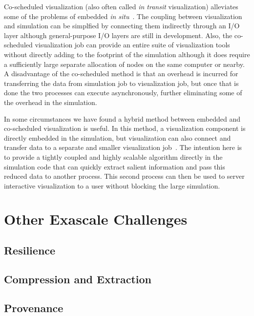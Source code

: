 \documentclass[conference]{IEEEtran}
\newcommand*{\lcite}[1]{~\cite{#1}}
\newcommand{\insitu}{{\it in situ}\xspace}
\newcommand{\intransit}{{\it in transit}\xspace}
\begin{document}
Co-scheduled visualization (also often called \intransit visualization)
alleviates some of the problems of embedded
\insitu\lcite{Moreland2011:PDAC,Biddiscombe2012,Klasky2011}.  The coupling
between visualization and simulation can be simplfied by connecting them
indirectly through an I/O layer although general-purpose I/O layers are
still in development.  Also, the co-scheduled visualization job can provide
an entire suite of visualization tools without directly adding to the
footprint of the simulation although it does require a sufficiently large
separate allocation of nodes on the same computer or nearby.  A
disadvantage of the co-scheduled method is that an overhead is incurred for
transferring the data from simulation job to visualization job, but once
that is done the two processes can execute asynchronously, further
eliminating some of the overhead in the simulation.

In some circumstances we have found a hybrid method between embedded and
co-scheduled visualization is useful.  In this method, a visualization
component is directly embedded in the simulation, but visualization can
also connect and transfer data to a separate and smaller visualization
job\lcite{Moreland2011:PDAC}.  The intention here is to provide a tightly
coupled and highly scalable algorithm directly in the simulation code that
can quickly extract salient information and pass this reduced data to
another process.  This second process can then be used to server
interactive visualization to a user without blocking the large simulation.

\section{Other Exascale Challenges}
\label{sec:Other}

\noindent

\subsection{Resilience}

\noindent

\subsection{Compression and Extraction}

\noindent

\subsection{Provenance}
\end{document}
